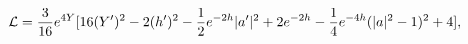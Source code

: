 \begin{equation}
{\cal L}= {3\over16}e^{4Y}[16(Y')^{2}- 2(h')^{2} -\frac{1}{2}e^{-2h}|a'|^2+2e^{-2h}-\frac{1}{4}e^{-4h}(|a|^2-1)^2+4],
\label{lagmn2}
\end{equation}

